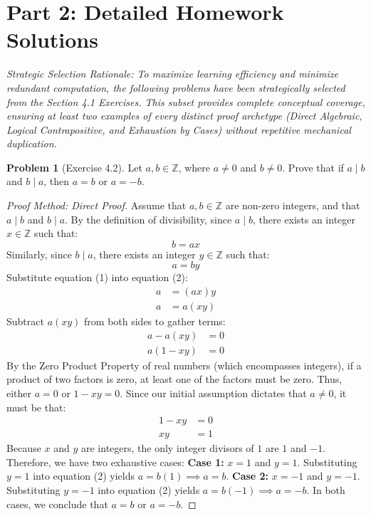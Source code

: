 \documentclass[11pt]{article}
\theoremstyle{definition}
\newtheorem{problem}{Problem}
\theoremstyle{remark}
\begin{document}
\newpage
\section{Part 2: Detailed Homework Solutions}
\textit{Strategic Selection Rationale: To maximize learning efficiency and minimize redundant computation, the following problems have been strategically selected from the Section 4.1 Exercises. This subset provides complete conceptual coverage, ensuring at least two examples of every distinct proof archetype (Direct Algebraic, Logical Contrapositive, and Exhaustion by Cases) without repetitive mechanical duplication.}

\begin{problem}[Exercise 4.2]
Let $a, b \in \mathbb{Z}$, where $a \neq 0$ and $b \neq 0$. Prove that if $a \mid b$ and $b \mid a$, then $a = b$ or $a = -b$.
\end{problem}
\begin{proof}[Proof Method: Direct Proof]
Assume that $a, b \in \mathbb{Z}$ are non-zero integers, and that $a \mid b$ and $b \mid a$. 
By the definition of divisibility, since $a \mid b$, there exists an integer $x \in \mathbb{Z}$ such that:
\begin{equation}
b = ax
\end{equation}
Similarly, since $b \mid a$, there exists an integer $y \in \mathbb{Z}$ such that:
\begin{equation}
a = by
\end{equation}
Substitute equation (1) into equation (2):
\begin{align*}
a &= (ax)y \\
a &= a(xy)
\end{align*}
Subtract $a(xy)$ from both sides to gather terms:
\begin{align*}
a - a(xy) &= 0 \\
a(1 - xy) &= 0
\end{align*}
By the Zero Product Property of real numbers (which encompasses integers), if a product of two factors is zero, at least one of the factors must be zero. Thus, either $a = 0$ or $1 - xy = 0$.
Since our initial assumption dictates that $a \neq 0$, it must be that:
\begin{align*}
1 - xy &= 0 \\
xy &= 1
\end{align*}
Because $x$ and $y$ are integers, the only integer divisors of $1$ are $1$ and $-1$. Therefore, we have two exhaustive cases:
\textbf{Case 1:} $x = 1$ and $y = 1$.
Substituting $y = 1$ into equation (2) yields $a = b(1) \implies a = b$.
\textbf{Case 2:} $x = -1$ and $y = -1$.
Substituting $y = -1$ into equation (2) yields $a = b(-1) \implies a = -b$.
In both cases, we conclude that $a = b$ or $a = -b$. 
\end{proof}
\end{document}
